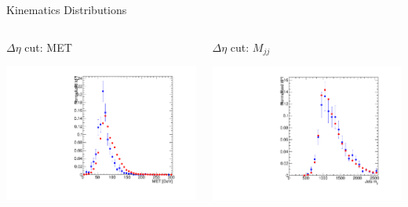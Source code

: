 \documentclass[8pt]{beamer}
\begin{document}
\begin{frame}{Kinematics Distributions}

\begin{columns}
\begin{block}{$\Delta\eta$ cut: MET}
 
\centering
\includegraphics[width=\linewidth]{img/DEta_met.pdf} 
 
\end{block}

\begin{block}{$\Delta\eta$ cut: $M_{jj}$}

\centering
\includegraphics[width=\linewidth]{img/DEta_mjj.pdf} 
 
\end{block}



\end{columns}
\end{frame}
\end{document}
